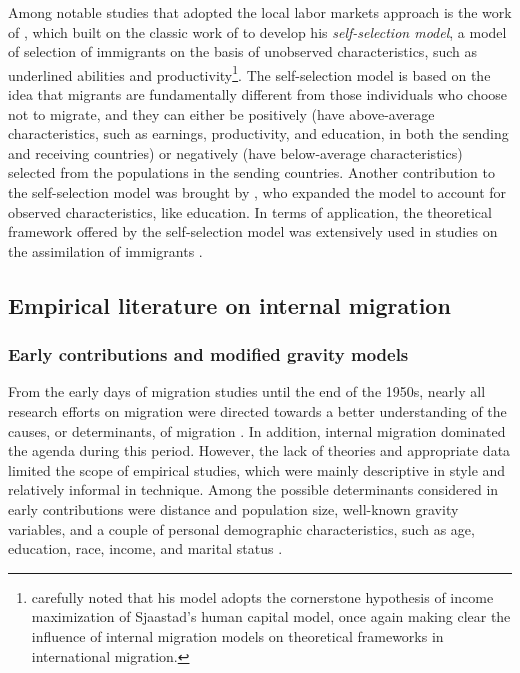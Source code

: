 Among notable studies that adopted the local labor markets approach is the work of \cite{borjas_self-selection_1987}, which built on the classic work of \cite{roy_thoughts_1951} to develop his \textit{self-selection model}, a model of selection of immigrants on the basis of unobserved characteristics, such as underlined abilities and productivity\footnote{ \cite{borjas_self-selection_1987} carefully noted that his model adopts the cornerstone hypothesis of income maximization of Sjaastad's human capital model, once again making clear the influence of internal migration models on theoretical frameworks in international migration.}. The self-selection model is based on the idea that migrants are fundamentally different from those individuals who choose not to migrate, and they can either be positively (have above-average characteristics, such as earnings, productivity, and education, in both the sending and receiving countries) or negatively (have below-average characteristics) selected from the populations in the sending countries. Another contribution to the self-selection model was brought by \cite{borjas_immigration_1991}, who expanded the model to account for observed characteristics, like education. In terms of application, the theoretical framework offered by the self-selection model was extensively used in studies on the assimilation of immigrants \citep{borjas_self-selection_1987, borjas_immigration_1991, borjas_economics_1994}.

\subsection{Empirical literature on internal migration} \label{lit_review_empirical_internal}

\subsubsection{Early contributions and modified gravity models}

From the early days of migration studies until the end of the 1950s, nearly all research efforts on migration were directed towards a better understanding of the causes, or determinants, of migration \citep{sjaastad_costs_1962, greenwood_research_1975, greenwood_early_2003}. In addition, internal migration dominated the agenda during this period. However, the lack of theories and appropriate data limited the scope of empirical studies, which were mainly descriptive in style and relatively informal in technique. Among the possible determinants considered in early contributions were distance and population size, well-known gravity variables, and a couple of personal demographic characteristics, such as age, education, race, income, and marital status \citep{greenwood_internal_1997}.

